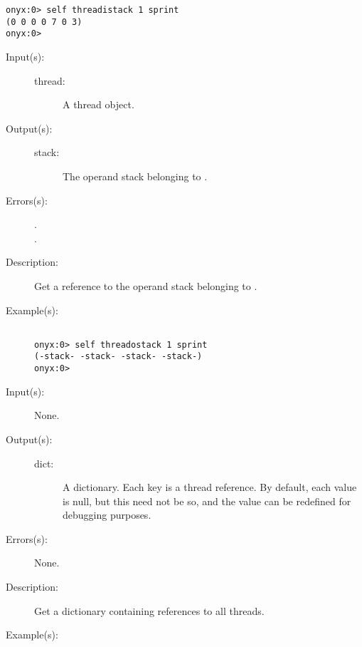\begin{description}
\begin{description}
\begin{verbatim}
onyx:0> self threadistack 1 sprint
(0 0 0 0 7 0 3)
onyx:0>
		\end{verbatim}
	\end{description}
\label{systemdict:threadostack}
\item[{\onyxop{thread}{threadostack}{stack}}: ]
	\begin{description}\item[]
	\item[Input(s): ]
		\begin{description}\item[]
		\item[thread: ]
			A thread object.
		\end{description}
	\item[Output(s): ]
		\begin{description}\item[]
		\item[stack: ]
			The operand stack belonging to .
		\end{description}
	\item[Errors(s): ]
		\begin{description}\item[]
		\item[.]
		\item[.]
		\end{description}
	\item[Description: ]
		Get a reference to the operand stack belonging to
		.
	\item[Example(s): ]\begin{verbatim}

onyx:0> self threadostack 1 sprint
(-stack- -stack- -stack- -stack-)
onyx:0>
		\end{verbatim}
	\end{description}
\label{systemdict:threadsdict}
\item[{\onyxop{--}{threadsdict}{dict}}: ]
	\begin{description}\item[]
	\item[Input(s): ] None.
	\item[Output(s): ]
		\begin{description}\item[]
		\item[dict: ]
			A dictionary.  Each key is a thread reference.  By
			default, each value is null, but this need not be so,
			and the value can be redefined for debugging purposes.
		\end{description}
	\item[Errors(s): ] None.
	\item[Description: ]
		Get a dictionary containing references to all threads.
	\item[Example(s): ]\begin{verbatim}


\end{verbatim}
\end{description}
\end{description}
